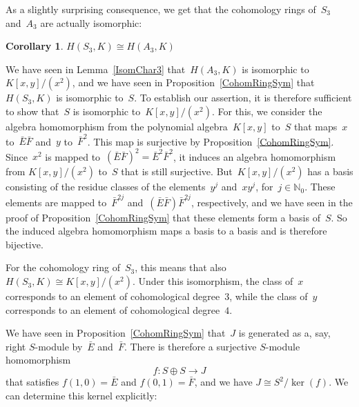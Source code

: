\documentclass[12pt]{article}
\makeatletter
\theoremstyle{definition}
\newtheorem{Cor}[Satz]{Corollary}
\theoremstyle{break}
\renewenvironment{proof}[1][\proofname]{\par
\vspace{-5pt}%
\pushQED{\qed}%
\normalfont
\topsep0pt \partopsep0pt %
\trivlist
\item[\hskip\labelsep
\bfseries
#1\@addpunct{.}]\ignorespaces
}{%
\popQED\endtrivlist\@endpefalse
\addvspace{6pt plus 6pt} %
}
\newcommand{\N}{\mathbb{N}}
\renewcommand{\1}{\mathbbm{1}}
\makeatother
\begin{document}
As a slightly surprising consequence, we get that the cohomology rings of~$S_3$ and~$A_3$ are actually isomorphic:
\begin{Cor} \label{CohomRingIsom}
$H(S_3, K) \cong H(A_3, K)$
\end{Cor}
\begin{proof}
We have seen in Lemma~\ref{IsomChar3} that~$H(A_3, K)$ is isomorphic
to~$K[x,y]/(x^2)$, and we have seen in Proposition~\ref{CohomRingSym} that~$H(S_3, K)$ is isomorphic to~$S$. To establish our assertion, it is therefore sufficient to show that~$S$ is isomorphic to~$K[x,y]/(x^2)$. For this, we consider the algebra homomorphism from the polynomial algebra~$K[x,y]$ to~$S$ that maps~$x$ to~$\bar{E} \bar{F}$ and~$y$ to~$\bar{F}^2$. This map is surjective by Proposition~\ref{CohomRingSym}. Since~$x^2$ is mapped
to~$(\bar{E} \bar{F})^2 = \bar{E}^2 \bar{F}^2$, it induces an algebra homomorphism from $K[x,y]/(x^2)$ to~$S$ that is still surjective. But~$K[x,y]/(x^2)$ has a basis consisting of the residue classes of the elements~$y^j$ and~$x y^j$, for~$j \in \N_0$. These elements are mapped to~$\bar{F}^{2j}$ and~$(\bar{E} \bar{F}) \bar{F}^{2j}$, respectively, and we have seen in the proof of Proposition~\ref{CohomRingSym} that these elements form a basis of~$S$. So the induced algebra homomorphism maps a basis to a basis and is therefore bijective.
\end{proof}

For the cohomology ring of~$S_3$, this means that also
$H(S_3, K) \cong K[x,y]/(x^2)$. Under this isomorphism, the class of~$x$ corresponds to an element of cohomological degree~$3$, while the class of~$y$ corresponds to an element of cohomological degree~$4$.

\vspace{2mm}

We have seen in Proposition~\ref{CohomRingSym} that~$J$ is generated as a, say, right $S$-module by~$\bar{E}$ and~$\bar{F}$. There is therefore a surjective $S$-module homomorphism
\[f \colon S \oplus S \to J\]
that satisfies $f(1,0) = \bar{E}$ and $f(0,1) = \bar{F}$, and we have
$J \cong S^2/\ker(f)$. We can determine this kernel explicitly:

\vspace{1mm}
\end{document}

